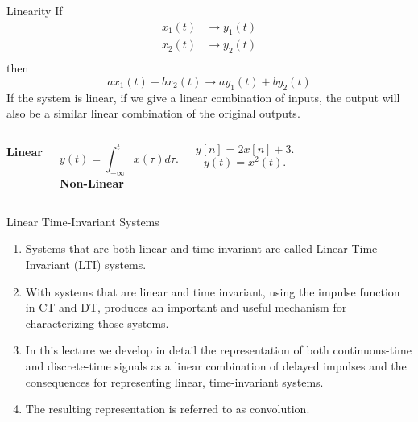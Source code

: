 \begin{frame}{Linearity}
    If
    \begin{align*}
      x_1(t) &\rightarrow y_1(t) \\
      x_2(t) &\rightarrow y_2(t) \\
    \end{align*}
    then
    \begin{equation*}
        ax_1(t) + bx_2(t) \rightarrow  ay_1(t) + by_2(t)
    \end{equation*}
    If the system is linear, if we give a linear combination of inputs, the output will also be a similar linear combination of the original outputs.
    {
        \begin{columns}
            \noindent\textbf{Linear}\par
            \begin{equation*}
                y(t) = \int_{-\infty}^{t}x(\tau)d\tau.
            \end{equation*}            
            \noindent\textbf{Non-Linear}\par   
            \begin{equation*}
                y[n] = 2x[n] + 3.
            \end{equation*}
            \begin{equation*}
                y(t) = x^2(t).
            \end{equation*}                                    
        \end{columns}
    }
\end{frame}




\begin{frame}{Linear Time-Invariant Systems}
    \begin{enumerate}
        \item Systems that are both linear and time invariant are called Linear Time-Invariant (LTI) systems.
        \item With systems that are linear and time invariant, using the impulse function in CT and DT, produces an important and useful mechanism for characterizing those systems.
        \item In this lecture we develop in detail the representation of both continuous-time and discrete-time signals as a linear combination of delayed impulses and the consequences for representing linear, time-invariant systems.
        \item The resulting representation is referred to as convolution.
    \end{enumerate}
    
\end{frame}


